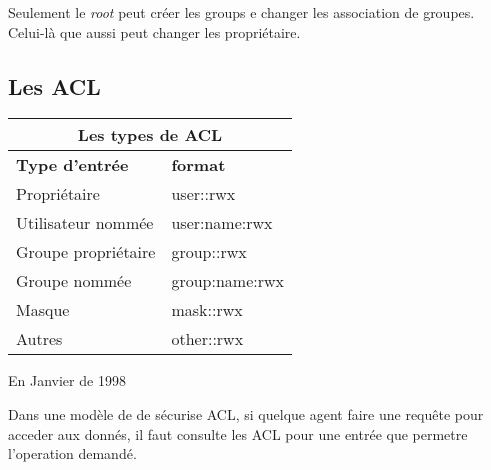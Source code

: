 \documentclass[draft]{article}
\begin{document}
Seulement le \emph{root} peut créer les groups e changer les association de groupes. Celui-là que aussi peut changer les propriétaire.  

\subsection*{Les ACL}

\begin{tabular}{|l|l|}
  \hline
    \multicolumn{2}{|c|}{Les types de ACL} \\
  \hline
	\textbf{Type d'entrée} & \textbf{format} \\
  \hline
	Propriétaire & user::rwx \\
	Utilisateur nommée & user:name:rwx  \\
	Groupe propriétaire & group::rwx \\
	Groupe nommée & group:name:rwx \\
	Masque & mask::rwx \\
	Autres & other::rwx \\   
  \hline
\end{tabular}







En Janvier de 1998\cite{aclsuse}


Dans une modèle de de sécurise ACL, si quelque agent faire une requête pour acceder aux donnés, il faut consulte les ACL pour une entrée que permetre l'operation demandé.    
\end{document}

